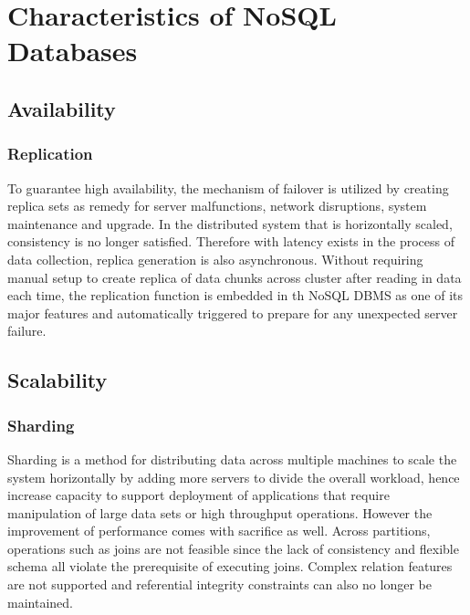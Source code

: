 \[\]
\section{Characteristics of NoSQL Databases}



\subsection{Availability}

\subsubsection{Replication}\mbox{}

\noindent To guarantee high availability, the mechanism of failover is utilized by creating replica sets as remedy for server malfunctions, network disruptions, system maintenance and upgrade. In the distributed system that is horizontally scaled, consistency is no longer satisfied. Therefore with latency exists in the process of data collection, replica generation is also asynchronous. Without requiring manual setup to create replica of data chunks across cluster after reading in data each time, the  replication function is embedded in th NoSQL DBMS as one of its major features and automatically triggered to prepare for any unexpected server failure. 

\subsection{Scalability}


\subsubsection{Sharding}\mbox{}


\noindent Sharding is a method for distributing data across multiple machines to scale the system horizontally by adding more servers to divide the overall workload, hence increase capacity to support deployment of applications that require manipulation of large data sets or high throughput operations. However the improvement of performance comes with sacrifice as well. Across partitions, operations such as joins are not feasible since the lack of consistency and flexible schema all violate the prerequisite of executing joins. Complex relation features are not supported and referential integrity constraints can also no longer be maintained. \\


